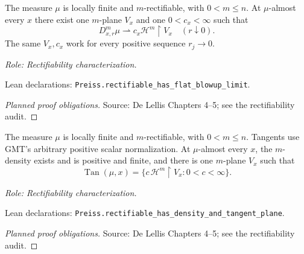 \begin{theorem}
\label{thm:rectifiable-blowup}







The measure \(\mu\) is locally finite and \(m\)-rectifiable, with \(0<m\leq n\).
At \(\mu\)-almost every \(x\) there exist one \(m\)-plane \(V_x\) and one \(0<c_x<\infty\) such that
\[
 D^m_{x,r}\mu\rightharpoonup c_x\mathcal H^m\!\restriction V_x
 \quad(r\downarrow0).
\]
The same \(V_x,c_x\) work for every positive sequence \(r_j\to0\).
\par\emph{Role: Rectifiability characterization.}
\par Lean declarations: \texttt{Preiss.rectifiable\_has\_flat\_blowup\_limit}.
\end{theorem}
\begin{proof}[Planned proof obligations]

\par Source: De Lellis Chapters 4--5; see the rectifiability audit.
\end{proof}

\begin{corollary}
\label{cor:rectifiable-tangent-plane}







The measure \(\mu\) is locally finite and \(m\)-rectifiable, with \(0<m\leq n\). Tangents use GMT's arbitrary positive scalar normalization.
At \(\mu\)-almost every \(x\), the \(m\)-density exists and is positive and finite, and there is one \(m\)-plane \(V_x\) such that
\[
 \operatorname{Tan}(\mu,x)
 =\{c\,\mathcal H^m\!\restriction V_x:0<c<\infty\}.
\]
\par\emph{Role: Rectifiability characterization.}
\par Lean declarations: \texttt{Preiss.rectifiable\_has\_density\_and\_tangent\_plane}.
\end{corollary}
\begin{proof}[Planned proof obligations]

\par Source: De Lellis Chapters 4--5; see the rectifiability audit.
\end{proof}

